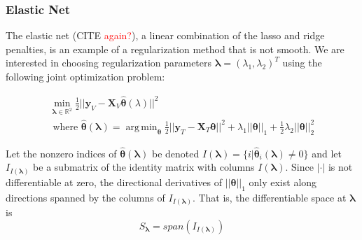 \documentclass[10pt,letterpaper]{article}
\DeclareMathOperator*{\argmin}{arg\,min}
\begin{document}
%



\subsubsection{Elastic Net}

The elastic net (CITE \textcolor{red}{again?}), a linear combination of the lasso and ridge penalties, is an example of a regularization method that is not smooth. We are interested in choosing regularization parameters $\boldsymbol{\lambda} = (\lambda_1, \lambda_2)^T$ using the following joint optimization problem:

\begin{equation}
\begin{array}{c}
\min_{\boldsymbol{\lambda} \in \mathbb{R}^2} \frac{1}{2} \lvert\lvert \boldsymbol{y}_V - \boldsymbol{X}_V \hat{\boldsymbol{\theta}} (\lambda) \rvert\rvert ^2 \\
\text{ where }
\hat{\boldsymbol{\theta}} (\boldsymbol{\lambda}) = \argmin_{\boldsymbol{\theta}} \frac{1}{2} \lvert\lvert \boldsymbol{y}_T - \boldsymbol{X}_T \boldsymbol{\theta} \rvert\rvert ^2
+ \lambda_1 \lvert\lvert \boldsymbol{\theta} \rvert \rvert_1
+ \frac{1}{2}\lambda_2 \lvert\lvert \boldsymbol{\theta} \rvert \rvert_2^2
\end{array}
\end{equation}

Let the nonzero indices of $\hat{\boldsymbol{\theta}}(\boldsymbol{\lambda})$ be denoted $I(\boldsymbol\lambda) = \{i | \hat{\boldsymbol{\theta}}_i(\boldsymbol\lambda) \ne 0\}$ and let $I_{I(\boldsymbol \lambda)}$ be a submatrix of the identity matrix with columns $I(\boldsymbol\lambda)$. Since $|\cdot|$ is not differentiable at zero, the directional derivatives of $||\boldsymbol \theta||_1$ only exist along directions spanned by the columns of $I_{I(\boldsymbol \lambda)}$. That is, the differentiable space at $\boldsymbol \lambda$ is
\begin{equation}
S_{\boldsymbol{\lambda}} = span(I_{I(\boldsymbol \lambda)})
\end{equation}
\end{document}
